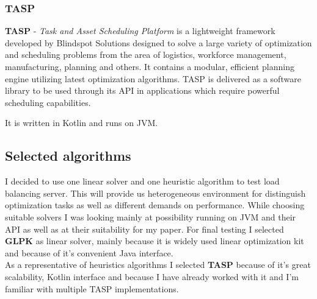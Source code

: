 \subsubsection{TASP}
\textbf{TASP} - \textit{Task and Asset Scheduling Platform}  is a lightweight framework developed by Blindspot Solutions designed to solve a large
variety of optimization and scheduling problems from the area of logistics, workforce management, manufacturing, planning and others.
It contains a modular, efficient planning engine utilizing latest optimization algorithms.
TASP is delivered as a software library to be used through its API in applications which require powerful scheduling capabilities.

It is written in Kotlin and runs on JVM\@.

\subsection{Selected algorithms}\label{subsec:selected-algorithms}
I decided to use one linear solver and one heuristic algorithm to test load balancing server.
This will provide us heterogeneous environment for distinguish optimization tasks as well as different demands on performance.
While choosing suitable solvers I was looking mainly at possibility running on JVM and their API as well as at their suitability for my paper.
For final testing I selected \textbf{GLPK} as linear solver, mainly because it is widely used linear optimization kit
and because of it's convenient Java interface.\\
As a representative of heuristics algorithms I selected \textbf{TASP} because of it's great scalability, Kotlin interface
and because I have already worked with it and I'm familiar with multiple TASP implementations.
